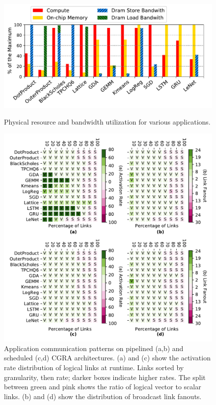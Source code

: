 \begin{figure}
\centering
\includegraphics[width=0.8\columnwidth]{network/figs/util_bw2.pdf}
\caption[Resource and bandwidth utilization]{
  Physical resource and bandwidth utilization for various applications.}\label{fig:util_bw}
\centering
\includegraphics[width=0.8\columnwidth]{network/figs/link7.pdf}
  \caption[Application communication patterns]{Application communication patterns on pipelined (a,b) and scheduled (c,d) CGRA architectures.
  (a) and (c) show the activation rate distribution of logical links at runtime. 
  Links sorted by granularity, then rate; darker boxes indicate higher rates.
  The split between green and pink shows the ratio of logical vector to scalar links. (b) and (d) show the distribution of broadcast link fanouts.
 }\label{fig:link}
\end{figure}

